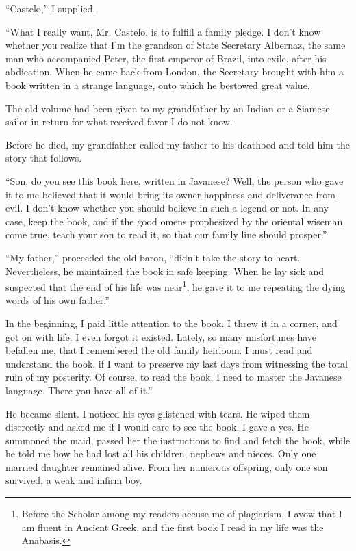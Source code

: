 \documentclass[a4paper,12pt]{book}
\begin{document}
``Castelo,'' I supplied.

``What I really want, Mr. Castelo,
is to fulfill a family pledge.
I don't know whether you realize that I'm the
grandson of State Secretary Albernaz, the same
man who accompanied Peter,
the first emperor of Brazil,
into exile, after his abdication.
When he came back from London,
the Secretary brought with him a book written in a strange
language, onto which he bestowed great value.

The old volume had been given to my grandfather
by an Indian or a Siamese sailor in
return for what received favor I do not know.

Before he died, my grandfather called
my father to his deathbed and told him
the story that follows.

``Son, do you see this book here, written in Javanese?
Well, the person who
gave it to me believed that it would bring its owner
happiness and deliverance from evil. I don't know
whether you should believe in such a legend or not.
In any case, keep the book, and if
the good omens prophesized by the oriental wiseman
come true, teach your son to read it,
so that our family line should prosper.''

``My father,'' proceeded the old baron, ``didn't take
the story to heart. Nevertheless, he maintained
the book in safe keeping.
When he lay sick and suspected that the end of his
life was near\footnote{Before the Scholar among
my readers accuse me of plagiarism,
I avow that I am fluent in Ancient Greek,
and the first book I read in my life
was the Anabasis.},
he gave it to me repeating the
dying words of his own father.''

In the beginning, I 
paid little attention to the book. I threw it 
in a corner, and got on with life.
I even forgot it existed. Lately,
so many misfortunes have befallen me,
that I remembered the old family heirloom.
I must read and understand the book, if I want to
preserve my last days from witnessing the total
ruin of my posterity. Of course, to read the book,
I need to master the Javanese language.
There you have all of it.''

He became silent. I noticed his eyes glistened
with tears.
He wiped them discreetly and asked me if I
would care to see the book. I gave a yes.
He summoned the maid, passed her the instructions
to find and fetch the book,
while he told me how he had lost all his children,
nephews and nieces. Only one married daughter
remained alive. From her numerous offspring,
only one son survived, a  weak and infirm boy.
\end{document}
